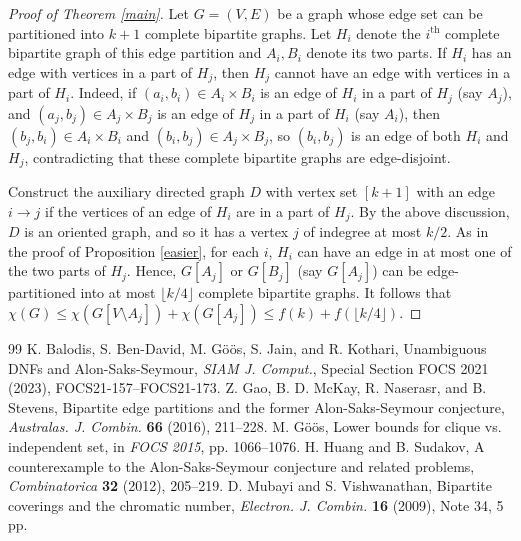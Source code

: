 \documentclass[10pt,a4paper]{amsart}
\begin{document}
\begin{proof}[Proof of Theorem \ref{main}]
Let $G=(V,E)$ be a graph whose edge set can be partitioned into $k+1$ complete bipartite graphs. Let $H_i$ denote the $i^{\textrm{th}}$ complete bipartite graph of this edge partition and $A_i,B_i$ denote its two parts. If $H_i$ has an edge with vertices in a part of $H_j$, then $H_j$ cannot have an edge with vertices in a part of $H_i$. Indeed, if $(a_i,b_i) \in A_i \times B_i$ is an edge of $H_i$ in a part of $H_j$ (say $A_j$), and $(a_j,b_j) \in A_j \times B_j$ is an edge of $H_j$ in a part of $H_i$ (say $A_i$), then $(b_j,b_i) \in A_i \times B_i$ and $(b_i,b_j) \in A_j \times B_j$, so $(b_i,b_j)$ is an edge of both $H_i$ and $H_j$, contradicting that these complete bipartite graphs are edge-disjoint. 

Construct the auxiliary directed graph $D$ with vertex set $[k+1]$ with an edge $i \rightarrow j$  if the vertices of an edge of $H_i$ are in a part of $H_j$. By the above discussion, $D$ is an oriented graph, and so it has a vertex $j$ of indegree at most $k/2$. As in the proof of Proposition \ref{easier}, for each $i$, $H_i$ can have an edge in at most one of the two parts of $H_j$. Hence, $G[A_j]$ or $G[B_j]$ (say $G[A_j]$) can be edge-partitioned into at most $\lfloor k/4 \rfloor$ complete bipartite graphs. It follows that $\chi(G) \leq \chi(G[V \setminus A_j])+\chi(G[A_j]) \leq f(k)+f(\lfloor k/4 \rfloor)$. 
\end{proof}


\begin{thebibliography}{99}
 K. Balodis, S. Ben-David, M. G\"o\"os, S. Jain, and R. Kothari, Unambiguous DNFs and Alon-Saks-Seymour, {\it SIAM J. Comput.}, Special Section FOCS 2021 (2023), FOCS21-157--FOCS21-173.
 Z. Gao, B. D. McKay, R. Naserasr, and B. Stevens, Bipartite edge partitions and the former Alon-Saks-Seymour conjecture, {\it Australas. J. Combin.} {\bf 66} (2016), 211--228.
 M. G\"o\"os, Lower bounds for clique vs. independent set, in {\it FOCS 2015}, pp. 1066--1076.
 H. Huang and B. Sudakov, A counterexample to the Alon-Saks-Seymour conjecture and related problems, {\it Combinatorica} {\bf 32} (2012), 205--219.
 D. Mubayi and S. Vishwanathan, Bipartite coverings and the chromatic number, {\it Electron. J. Combin.} {\bf 16} (2009), Note 34, 5 pp.
\end{thebibliography}
\end{document}
